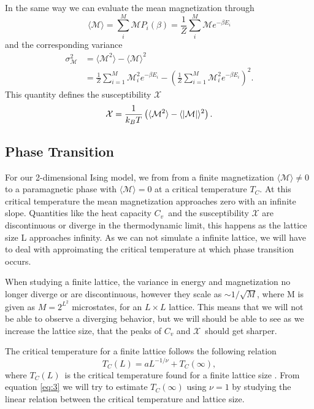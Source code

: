 \documentclass[%
reprint,
nofootinbib,
amsmath,amssymb,
aps,
]{revtex4-1}
\begin{document}
In the same way we can evaluate the mean magnetization through 
\begin{equation}\label{eq:M}
	\langle\mathcal{M}\rangle = \sum_i^M\mathcal{M}P_i(\beta) = \frac{1}{Z}\sum_i^M\mathcal{M}e^{-\beta E_i}
\end{equation}
and the corresponding variance 
\begin{equation}
\begin{split} 
		\sigma_\mathcal{M}^2			&=\langle \mathcal{M}^2 \rangle -\langle \mathcal{M}\rangle^2 \\
			&= \frac{1}{Z}\sum_{i=1}^M\mathcal{M}_i^2e^{-\beta E_i} - \left(\frac{1}{Z}\sum_{i=1}^M\mathcal{M}_i^2e^{-\beta E_i}\right)^2.
		\end{split} 
\end{equation}
This quantity defines the susceptibility $\mathcal{X}$
\begin{equation}\label{eq:x}
	\mathcal{X} = \frac{1}{k_BT}\left(\langle \mathcal{M}^2 \rangle -\langle \abs{\mathcal{M}}\rangle^2\right).
\end{equation}
\subsection{Phase Transition} %
For our 2-dimensional Ising model, we from from a finite magnetization $\langle \mathcal{M} \rangle \neq 0$ to a paramagnetic phase with $\langle \mathcal{M} \rangle = 0$ at a critical temperature $T_C$. At this critical temperature the mean magnetization approaches zero with an infinite slope. Quantities like the heat capacity $C_v$ and the susceptibility $\mathcal{X}$ are discontinuous or diverge in the thermodynamic limit\cite{morten}, this happens as the lattice size L approaches infinity. As we can not simulate a infinite lattice, we will have to deal with approimating the critical temperature at which phase transition occurs. 

When studying a finite lattice, the variance in energy and magnetization no longer diverge or are discontinuous, however they scale as $\sim 1/\sqrt{M}$, where M is given as $M = 2^{L^2}$ microstates, for an $L\times L$ lattice. This means that we will not be able to observe a diverging behavior, but we will should be able to see as we increase the lattice size, that the peaks of $C_v$ and $\mathcal{X}$ should get sharper. 

The critical temperature for a finite lattice follows the following relation 
\begin{equation}\label{eq:3}
	T_C(L) = aL^{-1/\nu} + T_C(\infty),
\end{equation}
where $T_C(L)$ is the critical temperature found for a finite lattice size . From equation \eqref{eq:3} we will try to estimate $T_C(\infty)$ using $\nu = 1$ by studying the linear relation between the critical temperature and lattice size. 
\end{document}
